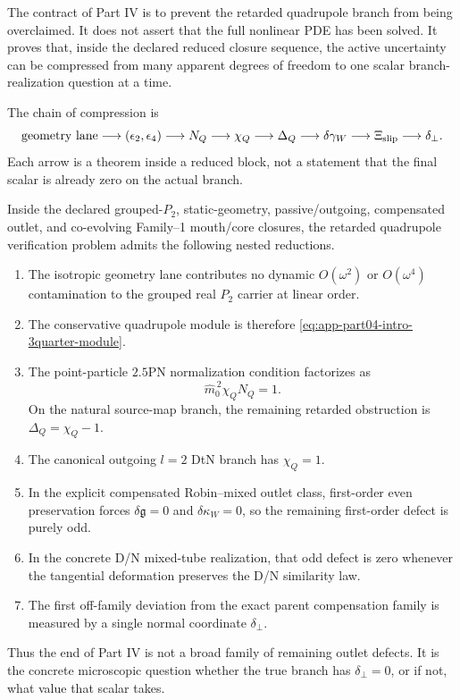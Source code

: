 The contract of Part IV is to prevent the retarded quadrupole branch from being overclaimed.  It does not assert that the full nonlinear PDE has been solved.  It proves that, inside the declared reduced closure sequence, the active uncertainty can be compressed from many apparent degrees of freedom to one scalar branch-realization question at a time.

The chain of compression is
\begin{equation}
\label{eq:app-part04-compression-chain}
\text{geometry lane}
\longrightarrow
(\epsilon_2,\epsilon_4)
\longrightarrow
N_Q
\longrightarrow
\chi_Q
\longrightarrow
\Delta_Q
\longrightarrow
\delta\gamma_W
\longrightarrow
\Xi_{\rm slip}
\longrightarrow
\delta_\perp .
\end{equation}
Each arrow is a theorem inside a reduced block, not a statement that the final scalar is already zero on the actual branch.

\begin{theorem}
\label{thm:app-part04-reduced-retarded-compression}
Inside the declared grouped-\(P_2\), static-geometry, passive/outgoing, compensated outlet, and co-evolving Family--1 mouth/core closures, the retarded quadrupole verification problem admits the following nested reductions.
\begin{enumerate}[leftmargin=2.2em]
\item The isotropic geometry lane contributes no dynamic \(O(\omega^2)\) or \(O(\omega^4)\) contamination to the grouped real \(P_2\) carrier at linear order.
\item The conservative quadrupole module is therefore \eqref{eq:app-part04-intro-3quarter-module}.
\item The point-particle \(2.5\)PN normalization condition factorizes as
\begin{equation}
\label{eq:app-part04-main-factorization}
\widehat m_0^{\,2}\chi_Q N_Q=1.
\end{equation}
On the natural source-map branch, the remaining retarded obstruction is \(\Delta_Q=\chi_Q-1\).
\item The canonical outgoing \(l=2\) DtN branch has \(\chi_Q=1\).
\item In the explicit compensated Robin--mixed outlet class, first-order even preservation forces \(\delta\mathfrak g=0\) and \(\delta\kappa_W=0\), so the remaining first-order defect is purely odd.
\item In the concrete D/N mixed-tube realization, that odd defect is zero whenever the tangential deformation preserves the D/N similarity law.
\item The first off-family deviation from the exact parent compensation family is measured by a single normal coordinate \(\delta_\perp\).
\end{enumerate}
Thus the end of Part IV is not a broad family of remaining outlet defects.  It is the concrete microscopic question whether the true branch has \(\delta_\perp=0\), or if not, what value that scalar takes.
\end{theorem}

